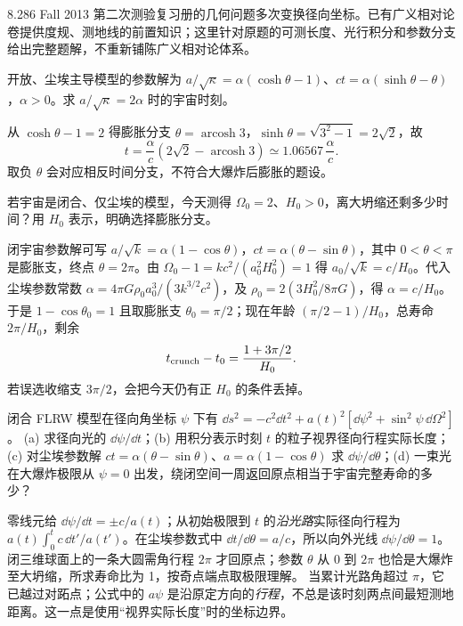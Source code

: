 8.286 Fall 2013 第二次测验复习册的几何问题多次变换径向坐标。已有广义相对论卷提供度规、测地线的前置知识；这里针对原题的可测长度、光行积分和参数分支给出完整题解，不重新铺陈广义相对论体系。

\begin{exercise}
开放、尘埃主导模型的参数解为 $a/\sqrt\kappa=\alpha(\cosh\theta-1)$、$ct=\alpha(\sinh\theta-\theta)$，$\alpha>0$。求 $a/\sqrt\kappa=2\alpha$ 时的宇宙时刻。
\end{exercise}
\begin{solution}
从 $\cosh\theta-1=2$ 得膨胀分支 $\theta=\operatorname{arcosh}3$，$\sinh\theta=\sqrt{3^2-1}=2\sqrt2$，故
\[
t=\frac{\alpha}{c}\left(2\sqrt2-\operatorname{arcosh}3\right)
\simeq1.06567\,\frac\alpha c .
\]
取负 $\theta$ 会对应相反时间分支，不符合大爆炸后膨胀的题设。
\end{solution}

\begin{exercise}
若宇宙是闭合、仅尘埃的模型，今天测得 $\Omega_0=2$、$H_0>0$，离大坍缩还剩多少时间？用 $H_0$ 表示，明确选择膨胀分支。
\end{exercise}
\begin{solution}
闭宇宙参数解可写 $a/\sqrt{k}=\alpha(1-\cos\theta)$，$ct=\alpha(\theta-\sin\theta)$，其中 $0<\theta<\pi$ 是膨胀支，终点 $\theta=2\pi$。由
$\Omega_0-1=kc^2/(a_0^2H_0^2)=1$ 得 $a_0/\sqrt{k}=c/H_0$。代入尘埃参数常数
$\alpha=4\pi G\rho_0a_0^3/(3k^{3/2}c^2)$，及 $\rho_0=2(3H_0^2/8\pi G)$，得 $\alpha=c/H_0$。于是 $1-\cos\theta_0=1$ 且取膨胀支 $\theta_0=\pi/2$；现在年龄 $(\pi/2-1)/H_0$，总寿命 $2\pi/H_0$，剩余
\[
t_{\rm crunch}-t_0=\frac{1+3\pi/2}{H_0}.
\]
若误选收缩支 $3\pi/2$，会把今天仍有正 $H_0$ 的条件丢掉。
\end{solution}

\begin{exercise}
闭合 FLRW 模型在径向角坐标 $\psi$ 下有
$\dd s^2=-c^2\dd t^2+a(t)^2[\dd\psi^2+\sin^2\psi\,\dd\Omega^2]$。
(a) 求径向光的 $\dd\psi/\dd t$；(b) 用积分表示时刻 $t$ 的粒子视界径向行程实际长度；(c) 对尘埃参数解 $ct=\alpha(\theta-\sin\theta)$、$a=\alpha(1-\cos\theta)$ 求 $\dd\psi/\dd\theta$；(d) 一束光在大爆炸极限从 $\psi=0$ 出发，绕闭空间一周返回原点相当于宇宙完整寿命的多少？
\end{exercise}
\begin{solution}
零线元给 $\dd\psi/\dd t=\pm c/a(t)$；从初始极限到 $t$ 的\emph{沿光路}实际径向行程为
$a(t)\int_0^t c\,\dd t'/a(t')$。在尘埃参数式中 $\dd t/\dd\theta=a/c$，所以向外光线 $\dd\psi/\dd\theta=1$。闭三维球面上的一条大圆需角行程 $2\pi$ 才回原点；参数 $\theta$ 从 0 到 $2\pi$ 也恰是大爆炸至大坍缩，所求寿命比为 1，按奇点端点取极限理解。
当累计光路角超过 $\pi$，它已越过对跖点；公式中的 $a\psi$ 是沿原定方向的\emph{行程}，不总是该时刻两点间最短测地距离。这一点是使用“视界实际长度”时的坐标边界。
\end{solution}


